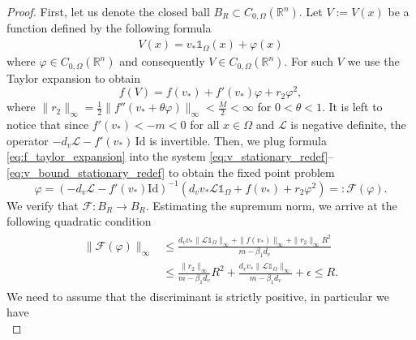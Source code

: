 \documentclass[review,onefignum,onetabnum]{SIAM-styles/siamart171218}
\begin{document}
\begin{proof}
    First, let us denote the closed ball $B_R \subset C_{0, \Omega}(\mathbb{R}^n)$. 
    Let $V:= V(x)$ be a function defined by the following formula
    \begin{align}
        \label{eq:stationary_u_definition}
        V(x) 
        = 
        v_* \mathds{1}_{\Omega}(x) + \varphi(x)
    \end{align}
    where $\varphi \in C_{0, \Omega}(\mathbb{R}^n)$ and consequently $V \in C_{0, \Omega}(\mathbb{R}^n)$. For such $V$ we use the Taylor expansion to obtain
    \begin{equation}
        \label{eq:f_taylor_expansion}
        f(V) = f(v_*) + f'(v_*) \varphi + r_2 \varphi^2,
    \end{equation}
    where $\|r_2\|_\infty = \frac{1}{2}\|f''(v_* + \theta\varphi)\|_\infty < \frac{M}{2} < \infty$ for $0 < \theta < 1$. It is left to notice that since $f'(v_*) < -m < 0$ for all $x \in \Omega$ and $\mathcal{L}$ is negative definite, the operator $-d_v\mathcal{L} - f'(v_*)\,\mathrm{Id}$ is invertible. Then, we plug formula \eqref{eq:f_taylor_expansion} into the system \eqref{eq:v_stationary_redef}--\eqref{eq:v_bound_stationary_redef} to obtain the fixed point problem
    \begin{equation}
        \label{eq:fixed_point_formulation}
        \varphi = \left( -d_v \mathcal{L} - f'(v_*) \mathrm{Id}  \right)^{-1} \left( d_v v_* \mathcal{L} \mathds{1}_\Omega + f(v_*) + r_2 \varphi^2 \right) =: \mathcal{F}(\varphi).
    \end{equation}
    We verify that $\mathcal{F}: B_R \rightarrow B_R$. Estimating the supremum norm, we arrive at the following quadratic condition
    \begin{align}
        \label{eq:f_ball_to_ball_condition_1}
        \begin{split}
            \| \mathcal{F}(\varphi) \|_\infty 
            &\leq
            \frac{d_v v_* \|\mathcal{L}\mathds{1}_\Omega\|_\infty + \|f(v_*)\|_\infty + \|r_2\|_\infty R^2}{m - \beta_1 d_v}
            \\
            &\leq
            \frac{\|r_2\|_\infty}{m - \beta_1 d_v} R^2 
            +
            \frac{d_v v_* \|\mathcal{L}\mathds{1}_\Omega\|_\infty}{m - \beta_1 d_v}
            +
            \epsilon
            \leq R.
        \end{split}
    \end{align}
    We need to assume that the discriminant is strictly positive, in particular we have
    \begin{equation}

\end{equation}
\end{proof}
\end{document}
